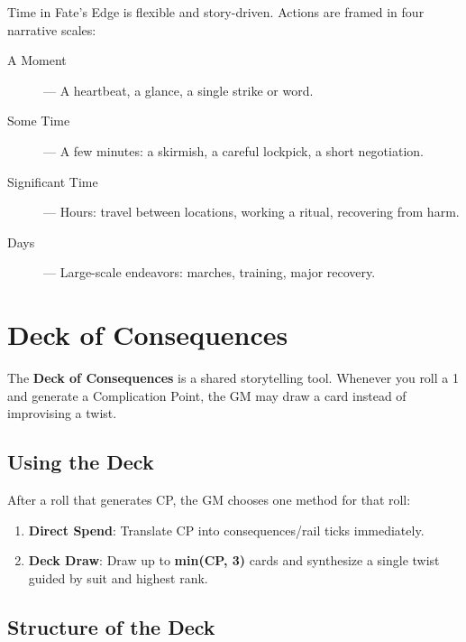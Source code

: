 Time in Fate's Edge is flexible and story-driven. Actions are framed in four narrative scales:

\begin{description}
  \item[A Moment]  — A heartbeat, a glance, a single strike or word.
  \item[Some Time]  — A few minutes: a skirmish, a careful lockpick, a short negotiation.
  \item[Significant Time]  — Hours: travel between locations, working a ritual, recovering from harm.
  \item[Days]  — Large-scale endeavors: marches, training, major recovery.
\end{description}

\section{Deck of Consequences}

The \textbf{Deck of Consequences} is a shared storytelling tool. Whenever you roll a 1 and generate a Complication Point, the GM may draw a card instead of improvising a twist.

\subsection*{Using the Deck}

After a roll that generates CP, the GM chooses one method for that roll:
\begin{enumerate}
  \item \textbf{Direct Spend}: Translate CP into consequences/rail ticks immediately.
  \item \textbf{Deck Draw}: Draw up to \textbf{min(CP, 3)} cards and synthesize a single twist guided by suit and highest rank.
\end{enumerate}

\subsection*{Structure of the Deck}


